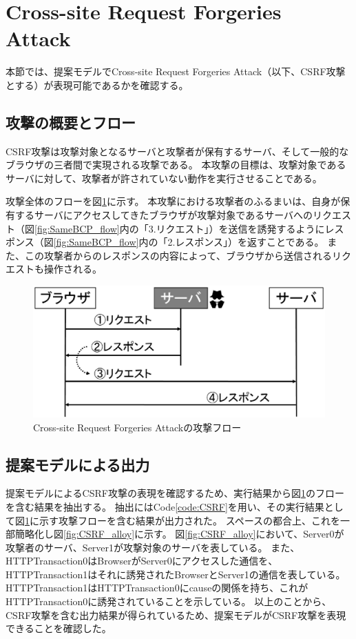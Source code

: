 \documentclass[12pt,a4paper]{jbook}
\begin{document}
\section{Cross-site Request Forgeries Attack}
本節では、提案モデルでCross-site Request Forgeries Attack\cite{cookie-model}（以下、CSRF攻撃とする）が表現可能であるかを確認する。

\subsection{攻撃の概要とフロー}
CSRF攻撃は攻撃対象となるサーバと攻撃者が保有するサーバ、そして一般的なブラウザの三者間で実現される攻撃である。
本攻撃の目標は、攻撃対象であるサーバに対して、攻撃者が許されていない動作を実行させることである。

攻撃全体のフローを図\ref{fig:CSRF_flow}に示す。
本攻撃における攻撃者のふるまいは、自身が保有するサーバにアクセスしてきたブラウザが攻撃対象であるサーバへのリクエスト（図\ref{fig:SameBCP_flow}内の「3.リクエスト」）を送信を誘発するようにレスポンス（図\ref{fig:SameBCP_flow}内の「2.レスポンス」）を返すことである。
また、この攻撃者からのレスポンスの内容によって、ブラウザから送信されるリクエストも操作される。

\begin{figure}[htb]
\centering
\includegraphics[width=400pt]{./fig/CSRF_flow.eps}
\caption{Cross-site Request Forgeries Attackの攻撃フロー}
\label{fig:CSRF_flow}
\end{figure}

\subsection{提案モデルによる出力}
提案モデルによるCSRF攻撃の表現を確認するため、実行結果から図\ref{fig:CSRF_flow}のフローを含む結果を抽出する。
抽出にはCode\ref{code:CSRF}を用い、その実行結果として図\ref{fig:CSRF_flow}に示す攻撃フローを含む結果が出力された。
スペースの都合上、これを一部簡略化し図\ref{fig:CSRF_alloy}に示す。
図\ref{fig:CSRF_alloy}において、Server0が攻撃者のサーバ、Server1が攻撃対象のサーバを表している。
また、HTTPTransaction0はBrowserがServer0にアクセスした通信を、HTTPTransaction1はそれに誘発されたBrowserとServer1の通信を表している。
HTTPTransaction1はHTTPTransaction0にcauseの関係を持ち、これがHTTPTransaction0に誘発されていることを示している。
以上のことから、CSRF攻撃を含む出力結果が得られているため、提案モデルがCSRF攻撃を表現できることを確認した。
\end{document}
